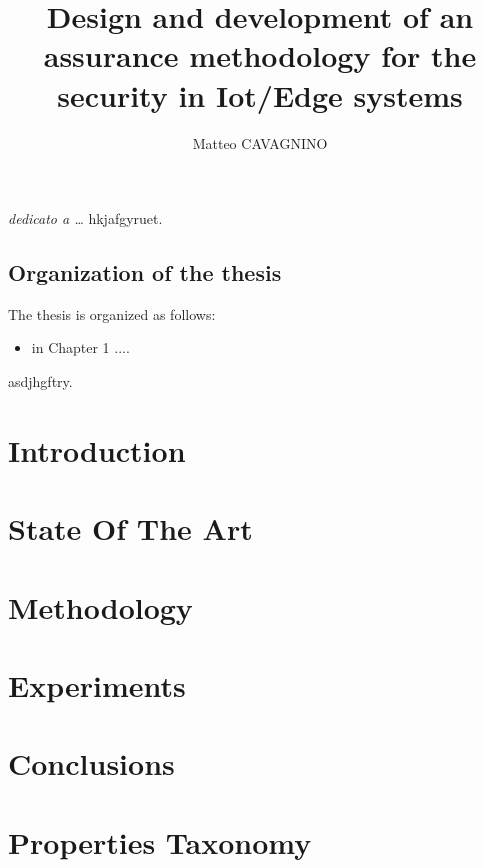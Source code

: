 \documentclass[a4paper,12pt]{report}
\begin{document}
\title{Design and development of an assurance methodology for the security in Iot/Edge systems}
\author{Matteo CAVAGNINO}
%
% 
%
\beforepreface
\prefacesection{}
        {\hfill \Large {\sl dedicato a \dots}}
% 
%
hkjafgyruet.
%
%
\section*{Organization of the thesis}
\label{organizzazione}
The thesis is organized as follows:
\begin{itemize}
\item in Chapter 1 ....
\end{itemize}
%
%
asdjhgftry.
\afterpreface
% 
% 
\chapter{Introduction}
\label{cap1}                        %



\chapter{State Of The Art}
\label{cap2}



\chapter{Methodology}
\label{cap3}


\chapter{Experiments}
\label{cap4}

\chapter{Conclusions}
\label{cap5}

\appendix
\chapter{Properties Taxonomy}




%
%
\begin{thebibliography}{00}



\end{thebibliography}
% 
\end{document}
